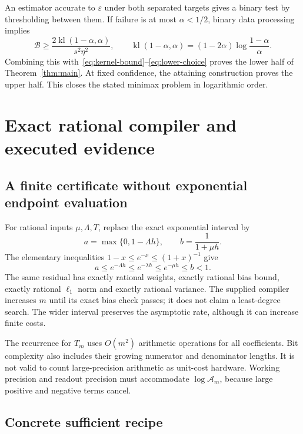 \documentclass[11pt,a4paper]{article}
\begin{document}
An estimator accurate to $\varepsilon$ under both separated targets gives a binary test by thresholding between them. If failure is at most $\alpha<1/2$, binary data processing implies
\begin{equation}\label{eq:confidence-lower}
\mathcal B\geq
\frac{2\operatorname{kl}(1-\alpha,\alpha)}{s^2\eta^2},\qquad
\operatorname{kl}(1-\alpha,\alpha)
=(1-2\alpha)\log\frac{1-\alpha}{\alpha}.
\end{equation}
Combining this with~\eqref{eq:kernel-bound}--\eqref{eq:lower-choice} proves the lower half of Theorem~\ref{thm:main}. At fixed confidence, the attaining construction proves the upper half. This closes the stated minimax problem in logarithmic order.

\section{Exact rational compiler and executed evidence}

\subsection{A finite certificate without exponential endpoint evaluation}

For rational inputs $\mu,\Lambda,T$, replace the exact exponential interval by
\begin{equation}\label{eq:rational}
a=\max\{0,1-\Lambda h\},\qquad b=\frac1{1+\mu h}.
\end{equation}
The elementary inequalities $1-x\leq e^{-x}\leq(1+x)^{-1}$ give
\[
a\leq e^{-\Lambda h}\leq e^{-\lambda h}\leq e^{-\mu h}\leq b<1.
\]
The same residual has exactly rational weights, exactly rational bias bound, exactly rational $\ell_1$ norm and exactly rational variance. The supplied compiler increases $m$ until its exact bias check passes; it does not claim a least-degree search. The wider interval preserves the asymptotic rate, although it can increase finite costs.

The recurrence for $T_m$ uses $O(m^2)$ arithmetic operations for all coefficients. Bit complexity also includes their growing numerator and denominator lengths. It is not valid to count large-precision arithmetic as unit-cost hardware. Working precision and readout precision must accommodate $\log\mathcal A_m$, because large positive and negative terms cancel.

\subsection{Concrete sufficient recipe}
\end{document}
